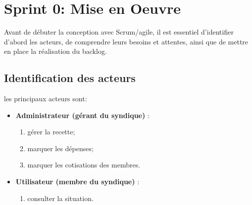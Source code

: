 \section{Sprint 0: Mise en Oeuvre}
Avant de débuter la conception avec Scrum/agile, il est essentiel d'identifier d'abord les acteurs, de comprendre leurs besoins et attentes, ainsi que de mettre en place la réalisation du backlog.
\subsection{Identification des acteurs}
les principaux acteurs sont: 
\begin{itemize}
    \item \textbf{Administrateur (gérant du syndique)} : 
    \begin{enumerate}
        \item gérer la recette;
        \item marquer les dépenses;
        \item marquer les cotisations des membres.
    \end{enumerate} 
    \item \textbf{Utilisateur (membre du syndique)} : 
    \begin{enumerate}
        \item consulter la situation.
    \end{enumerate}
\end{itemize}
